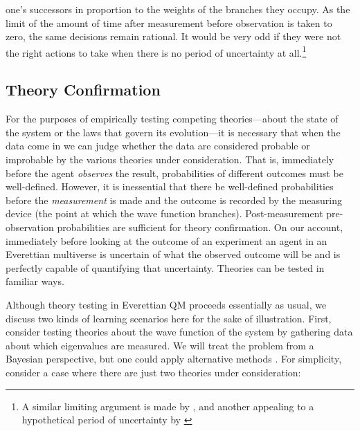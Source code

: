 \documentclass[onecolumn,secnumarabic,amsmath,amssymb,balancelastpage,nofootinbib]{article}
\begin{document}
one's successors in proportion to the weights of the branches they occupy.  As the limit of the amount of time after measurement before observation is taken to zero, the same decisions remain rational.  It would be very odd if they were not the right actions to take when there is no period of uncertainty at all.\footnote{A similar limiting argument is made by \citet[.1]{greaves2007b}, and another {appealing to} a hypothetical period of uncertainty by \citet[][]{tappenden2011}}

\subsection{Theory Confirmation}\label{inflink}

For the purposes of empirically testing competing theories---about the state of the system or the laws that govern its evolution---it is necessary that when the data come in we can judge whether the data are considered probable or improbable by the various theories under consideration.  That is, immediately before the agent \emph{observes} the result, probabilities of different outcomes must be well-defined.  However, it is inessential that there be well-defined probabilities before the \emph{measurement} is made and the outcome is recorded by the measuring device (the point at which the wave function branches).  Post-measurement pre-observation probabilities are sufficient for theory confirmation.  On our account, immediately before looking at the outcome of an experiment an agent in an Everettian multiverse is uncertain of what the observed outcome will be and is perfectly capable of quantifying that uncertainty.  Theories can be tested in familiar ways.

Although theory testing in Everettian QM proceeds essentially as usual, we discuss two kinds of learning scenarios here for the sake of illustration. First, consider testing theories about the wave function of the system by gathering data about which eigenvalues are measured.  We will treat the problem from a Bayesian perspective, but one could {apply alternative} methods \citep[see][ \& 6.3]{wallace2012}.  For simplicity, consider a case where there are just two theories under consideration:
\end{document}
